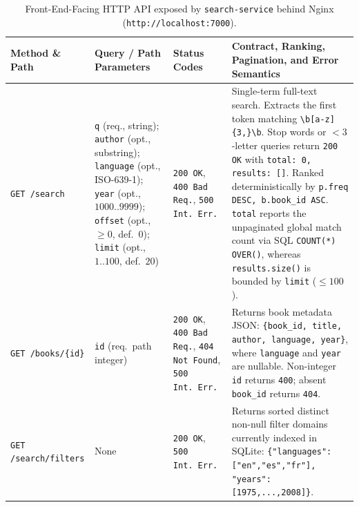 \documentclass[10pt,a4paper]{article}
\begin{document}
\begin{table}[!htbp]
\centering
\caption{Front-End-Facing HTTP API exposed by \texttt{search-service} behind Nginx (\texttt{http://localhost:7000}).}
\label{tab:frontend_api}
\scriptsize
\setlength{\tabcolsep}{4pt}
\renewcommand{\arraystretch}{1.2}
\begin{tabularx}{\textwidth}{L{2.5cm} L{3.6cm} L{1.9cm} Y}
\toprule
\textbf{Method \& Path} & \textbf{Query / Path Parameters} & \textbf{Status Codes} & \textbf{Contract, Ranking, Pagination, and Error Semantics} \\
\midrule
\texttt{GET /search} & \texttt{q} (req., string); \texttt{author} (opt., substring); \texttt{language} (opt., ISO-639-1); \texttt{year} (opt., $1000..9999$); \texttt{offset} (opt., $\ge 0$, def.\ $0$); \texttt{limit} (opt., $1..100$, def.\ $20$) & \texttt{200 OK}, \texttt{400 Bad Req.}, \texttt{500 Int.\ Err.} & Single-term full-text search. Extracts the first token matching \texttt{\textbackslash b[a-z]\{3,\}\textbackslash b}. Stop words or $<3$-letter queries return \texttt{200 OK} with \texttt{total: 0, results: []}. Ranked deterministically by \texttt{p.freq DESC, b.book\_id ASC}. \texttt{total} reports the unpaginated global match count via SQL \texttt{COUNT(*) OVER()}, whereas \texttt{results.size()} is bounded by \texttt{limit} ($\le 100$). \\
\addlinespace[2pt]
\texttt{GET /books/\{id\}} & \texttt{id} (req.\ path integer) & \texttt{200 OK}, \texttt{400 Bad Req.}, \texttt{404 Not Found}, \texttt{500 Int.\ Err.} & Returns book metadata JSON: \texttt{\{book\_id, title, author, language, year\}}, where \texttt{language} and \texttt{year} are nullable. Non-integer \texttt{id} returns \texttt{400}; absent \texttt{book\_id} returns \texttt{404}. \\
\addlinespace[2pt]
\texttt{GET /search/filters} & None & \texttt{200 OK}, \texttt{500 Int.\ Err.} & Returns sorted distinct non-null filter domains currently indexed in SQLite: \texttt{\{"languages": ["en","es","fr"], "years": [1975,...,2008]\}}. \\
\bottomrule
\end{tabularx}
\end{table}
\end{document}
